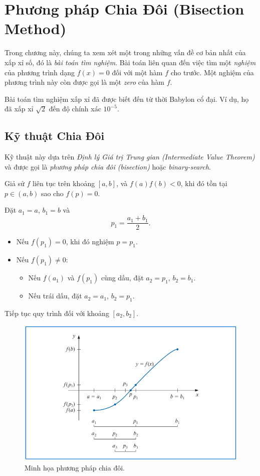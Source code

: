 \section{Phương pháp Chia Đôi (Bisection Method)}
\label{sec:bisection_method}

Trong chương này, chúng ta xem xét một trong những vấn đề cơ bản nhất của xấp xỉ số,
đó là \textit{bài toán tìm nghiệm}. Bài toán liên quan đến việc tìm một \textit{nghiệm}
của phương trình dạng $f(x)=0$ đối với một hàm $f$ cho trước. Một nghiệm của phương trình này
còn được gọi là một \textit{zero} của hàm $f$.

Bài toán tìm nghiệm xấp xỉ đã được biết đến từ thời Babylon cổ đại. Ví dụ,
họ đã xấp xỉ $\sqrt{2}$ đến độ chính xác $10^{-5}$. 

\subsection{Kỹ thuật Chia Đôi}
\label{subsec:bisection_technique}

Kỹ thuật này dựa trên \textit{Định lý Giá trị Trung gian (Intermediate Value Theorem)}
và được gọi là \textit{phương pháp chia đôi (bisection)} hoặc \textit{binary-search}.

Giả sử $f$ liên tục trên khoảng $[a,b]$, và $f(a)f(b) < 0$, khi đó tồn tại $p \in (a,b)$
sao cho $f(p)=0$.

Đặt $a_1=a$, $b_1=b$ và
\[
p_1 = \frac{a_1 + b_1}{2}.
\]

\begin{itemize}
    \item Nếu $f(p_1)=0$, khi đó nghiệm $p=p_1$.
    \item Nếu $f(p_1) \neq 0$:
        \begin{itemize}
            \item Nếu $f(a_1)$ và $f(p_1)$ cùng dấu, đặt $a_2=p_1$, $b_2=b_1$.
            \item Nếu trái dấu, đặt $a_2=a_1$, $b_2=p_1$.
        \end{itemize}
\end{itemize}

Tiếp tục quy trình đối với khoảng $[a_2,b_2]$.

\begin{figure}[!h]
\centering
\includegraphics[width=0.65\linewidth]{figures/bisect_diagram_placeholder.png}
\caption{Minh họa phương pháp chia đôi.}
\label{fig:bisection_figure1}
\end{figure}

